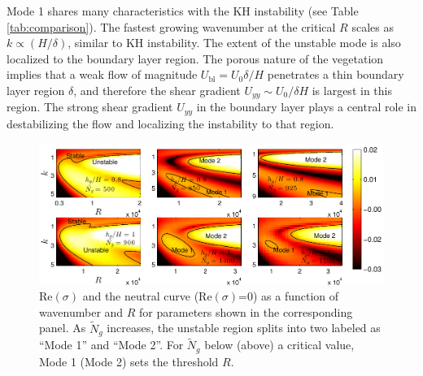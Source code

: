 \documentclass{jfm}
\renewcommand{\Rey}{{R}}
\newcommand{\Ndg}{\tilde{N}_g}
\newcommand{\ubl}{U_\text{bl}}
\begin{document}
Mode 1 shares many characteristics with the KH instability (see Table \ref{tab:comparison}). 
The fastest growing wavenumber at the critical $\Rey$ scales as $k \propto (H/\delta)$, similar to KH instability. 
The extent of the unstable mode is also localized to the boundary layer region.
The porous nature of the vegetation implies that a weak flow of magnitude $\ubl = U_0 \delta/H$ penetrates a thin boundary layer region $\delta$, and therefore the shear gradient $U_{yy} \sim U_0/\delta H$ is largest in this region. 
The strong shear gradient $U_{yy}$ in the boundary layer plays a central role in destabilizing the flow and localizing the instability to that region. 
\begin{figure}
 \includegraphics[width=\textwidth]{SetAll_imgsc}

\caption{
$\text{Re}(\sigma)$ and the neutral curve ($\text{Re}(\sigma)$=0) as a function of wavenumber and $\Rey$ for parameters shown in the corresponding panel.  
As $\Ndg$ increases, the unstable region splits into two labeled as ``Mode 1'' and ``Mode 2''. 
For $\Ndg$ below (above) a critical value, Mode 1 (Mode 2) sets the threshold $\Rey$.
}
\label{K_Re_sigma_set3}
\end{figure}
\end{document}
